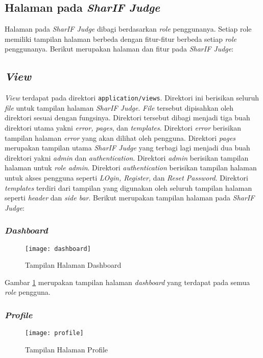 \subsection{Halaman pada \textit{SharIF Judge}}
Halaman pada \textit{SharIF Judge} dibagi berdasarkan \textit{role} penggunanya. Setiap role memiliki tampilan halaman berbeda dengan fitur-fitur berbeda setiap \textit{role} penggunanya. Berikut merupakan halaman dan fitur pada \textit{SharIF Judge}:

\subsection{\textit{View}}
\textit{View} terdapat pada direktori \texttt{application/views}. Direktori ini berisikan seluruh \textit{file} untuk tampilan halaman \textit{SharIF Judge}. \textit{File} tersebut dipisahkan oleh direktori sesuai dengan fungsinya. Direktori tersebut dibagi menjadi tiga buah direktori utama yakni \textit{error, pages}, dan \textit{templates}. Direktori \textit{error} berisikan tampilan halaman \textit{error} yang akan dilihat oleh pengguna. Direktori \textit{pages} merupakan tampilan utama \textit{SharIF Judge} yang terbagi lagi menjadi dua buah direktori yakni \textit{admin} dan \textit{authentication}. Direktori \textit{admin} berisikan tampilan halaman untuk \textit{role admin}. Direktori \textit{authentication} berisikan tampilan halaman untuk akses pengguna seperti \textit{LOgin, Register,} dan \textit{Reset Password}. Direktori \textit{templates} terdiri dari tampilan yang digunakan oleh seluruh tampilan halaman seperti \textit{header} dan \textit{side bar}. Berikut merupakan tampilan halaman pada \textit{SharIF Judge}:

\subsubsection{\textit{Dashboard}}
\begin{figure}[H]
	\centering  
	\texttt{[image: dashboard]}  
	\caption[Tampilan Halaman \textit{Dashboard}]{Tampilan Halaman Dashboard} 
	\label{fig:dashboard} 
\end{figure} 

Gambar \ref{fig:dashboard} merupakan tampilan halaman \textit{dashboard} yang terdapat pada semua \textit{role} pengguna.
\subsubsection{\textit{Profile}}
\begin{figure}[H]
	\centering  
	\texttt{[image: profile]}  
	\caption[Tampilan Halaman \textit{Profile}]{Tampilan Halaman Profile} 
	\label{fig:profile} 
\end{figure}


